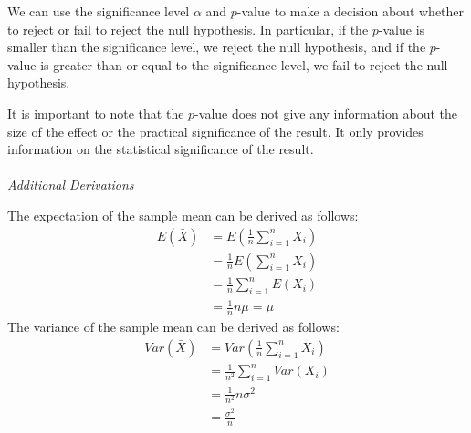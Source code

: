 \documentclass{./../../Latex/handout}
\begin{document}
We can use the significance level $\alpha$ and $p$-value to make a decision about whether to reject or fail to reject the null hypothesis. In particular, if the $p$-value is smaller than the significance level, we reject the null hypothesis, and if the $p$-value is greater than or equal to the significance level, we fail to reject the null hypothesis.

It is important to note that the $p$-value does not give any information about the size of the effect or the practical significance of the result. It only provides information on the statistical significance of the result.\\~\\

\textit{Additional Derivations}

The expectation of the sample mean can be derived as follows:
\begin{align*}
E(\bar{X}) &= E\left(\frac{1}{n} \sum_{i=1}^n X_i\right) \\
&= \frac{1}{n} E\left(\sum_{i=1}^n X_i\right) \\
&= \frac{1}{n} \sum_{i=1}^n E(X_i) \\
&= \frac{1}{n} n\mu = \mu
\end{align*}
The variance of the sample mean can be derived as follows:
\begin{align*}
Var(\bar{X}) &= Var\left(\frac{1}{n} \sum_{i=1}^n X_i\right) \\
&= \frac{1}{n^2} \sum_{i=1}^n Var(X_i) \\
&= \frac{1}{n^2} n \sigma^2 \\
&= \frac{\sigma^2}{n}
\end{align*}
\end{document}
